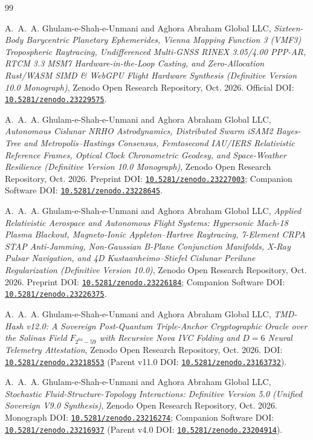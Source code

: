 \documentclass[11pt,a4paper,reqno]{article}
\def\mathbb#1{#1}%
\newcommand{\zenodo}[1]{\href{https://doi.org/10.5281/zenodo.#1}{\nolinkurl{10.5281/zenodo.#1}}}
\theoremstyle{plain}
\theoremstyle{definition}
\theoremstyle{remark}
\numberwithin{equation}{section}
\begin{document}
\begin{thebibliography}{99}

A.~A.~A. Ghulam-e-Shah-e-Unmani and {Aghora Abraham Global LLC},
\emph{Sixteen-Body Barycentric Planetary Ephemerides, Vienna Mapping Function 3 (VMF3) Tropospheric Raytracing, Undifferenced Multi-GNSS RINEX 3.05/4.00 PPP-AR, RTCM 3.3 MSM7 Hardware-in-the-Loop Casting, and Zero-Allocation Rust/WASM SIMD \& WebGPU Flight Hardware Synthesis (Definitive Version 10.0 Monograph)},
Zenodo Open Research Repository, Oct. 2026.
Official DOI: \zenodo{23229575}.

A.~A.~A. Ghulam-e-Shah-e-Unmani and {Aghora Abraham Global LLC},
\emph{Autonomous Cislunar NRHO Astrodynamics, Distributed Swarm iSAM2 Bayes-Tree and Metropolis--Hastings Consensus, Femtosecond IAU/IERS Relativistic Reference Frames, Optical Clock Chronometric Geodesy, and Space-Weather Resilience (Definitive Version 10.0 Monograph)},
Zenodo Open Research Repository, Oct. 2026.
Preprint DOI: \zenodo{23227003}; Companion Software DOI: \zenodo{23228645}.

A.~A.~A. Ghulam-e-Shah-e-Unmani and {Aghora Abraham Global LLC},
\emph{Applied Relativistic Aerospace and Autonomous Flight Systems: Hypersonic Mach-18 Plasma Blackout, Magneto-Ionic Appleton--Hartree Raytracing, 7-Element CRPA STAP Anti-Jamming, Non-Gaussian B-Plane Conjunction Manifolds, X-Ray Pulsar Navigation, and 4D Kustaanheimo--Stiefel Cislunar Perilune Regularization (Definitive Version 10.0)},
Zenodo Open Research Repository, Oct. 2026.
Preprint DOI: \zenodo{23226184}; Companion Software DOI: \zenodo{23226375}.

A.~A.~A. Ghulam-e-Shah-e-Unmani and {Aghora Abraham Global LLC},
\emph{TMD-Hash v12.0: A Sovereign Post-Quantum Triple-Anchor Cryptographic Oracle over the Solinas Field $\mathbb{F}_{2^{64}-59}$ with Recursive Nova IVC Folding and $D=6$ Neural Telemetry Attestation},
Zenodo Open Research Repository, Oct. 2026.
DOI: \zenodo{23218553} (Parent v11.0 DOI: \zenodo{23163732}).

A.~A.~A. Ghulam-e-Shah-e-Unmani and {Aghora Abraham Global LLC},
\emph{Stochastic Fluid-Structure-Topology Interactions: Definitive Version 5.0 (Unified Sovereign V9.0 Synthesis)},
Zenodo Open Research Repository, Oct. 2026.
Monograph DOI: \zenodo{23216274}; Companion Software DOI: \zenodo{23216937} (Parent v4.0 DOI: \zenodo{23204914}).


\end{thebibliography}
\end{document}
